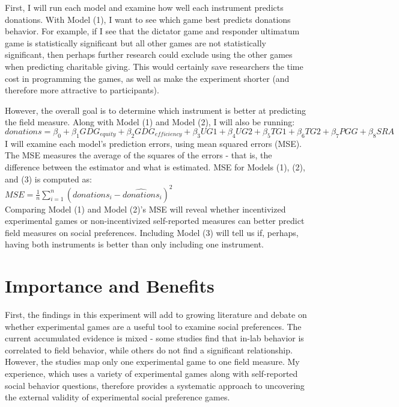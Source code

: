 \documentclass{article}
\begin{document}
First, I will run each model and examine how well each instrument predicts donations. With Model (1), I want to see which game best predicts donations behavior. For example, if I see that the dictator game and responder ultimatum game is statistically significant but all other games are not statistically significant, then perhaps further research could exclude using the other games when predicting charitable giving. This would certainly save researchers the time cost in programming the games, as well as make the experiment shorter (and therefore more attractive to participants). 

However, the overall goal is to determine which instrument is better at predicting the field measure. Along with Model (1) and Model (2), I will also be running:
\begin{equation}
donations=\beta_{0} + \beta_{1} GDG_{equity} + \beta_{2} GDG_{efficiency} + \beta_{3} UG1 + \beta_{4} UG2 + \beta_{5} TG1 + \beta_{6} TG2 + \beta_{7} PGG + \beta_{8}SRA
\end{equation}
I will examine each model's prediction errors, using mean squared errors (MSE). The MSE measures the average of the squares of the errors - that is, the difference between the estimator and what is estimated. MSE for Models (1), (2), and (3) is computed as: \\

\( MSE = \frac{1}{n}\sum_{i=1}^{n}(donations_{i}-\hat{donations}_{i})^{2} \) \\


Comparing Model (1) and Model (2)\rq s MSE will reveal whether incentivized experimental games or non-incentivized self-reported measures can better predict field measures on social preferences. Including Model (3) will tell us if, perhaps, having both instruments is better than only including one instrument.


\section{Importance and Benefits}

First, the findings in this experiment will add to growing literature and debate on whether experimental games are a useful tool to examine social preferences. The current accumulated evidence is mixed - some studies find that in-lab behavior is correlated to field behavior, while others do not find a significant relationship. However, the studies map only one experimental game to one field measure. My experience, which uses a variety of experimental games along with self-reported social behavior questions, therefore provides a systematic approach to uncovering the external validity of experimental social preference games. 
\end{document}
